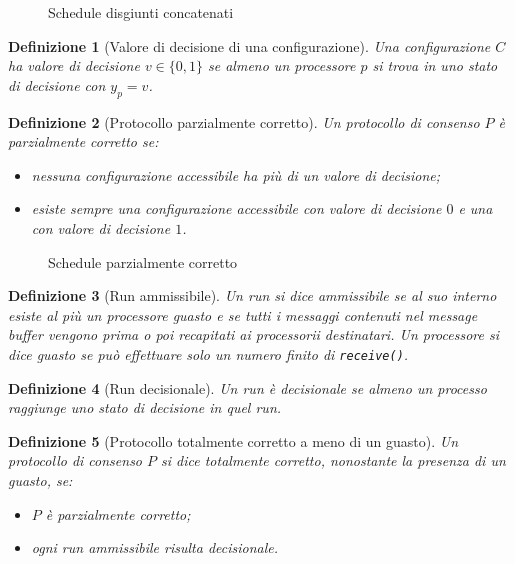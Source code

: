 \documentclass{article}
\newtheorem{definizione}{Definizione}
\begin{document}
\begin{figure}[!h]
\centering
\caption{Schedule disgiunti concatenati}\label{fig:concatenazioneSchedule}
\end{figure}

\begin{definizione}[Valore di decisione di una configurazione]
Una configurazione $C$ ha valore di decisione $v \in \{0,1\}$ se almeno un processore $p$ si trova in uno stato di decisione con $y_p=v$. 
\end{definizione}

\begin{definizione}[Protocollo parzialmente corretto]
Un protocollo di consenso $P$ è parzialmente corretto se:
\begin{itemize}
\item nessuna configurazione accessibile ha più di un valore di decisione;
\item esiste sempre una configurazione accessibile con valore di decisione $0$ e una con valore di decisione $1$.
\end{itemize}  
\end{definizione}

\begin{figure}[!h]
\centering
\caption{Schedule parzialmente corretto}\label{fig:parzialmenteCorretto}
\end{figure}

\begin{definizione}[Run ammissibile]
Un run si dice ammissibile se al suo interno esiste al più un processore guasto e se tutti i messaggi contenuti nel message buffer vengono prima o poi recapitati ai processorii destinatari. Un processore si dice guasto se può effettuare solo un numero finito di \texttt{receive()}.
\end{definizione}

\begin{definizione}[Run decisionale]
Un run è decisionale se almeno un processo raggiunge uno stato di decisione in quel run.
\end{definizione}

\begin{definizione}[Protocollo totalmente corretto a meno di un guasto]
Un protocollo di consenso $P$ si dice totalmente corretto, nonostante la presenza di un guasto, se:
\begin{itemize}
\item  $P$ è parzialmente corretto;
\item  ogni run ammissibile risulta decisionale.
\end{itemize}
\end{definizione}
\end{document}
